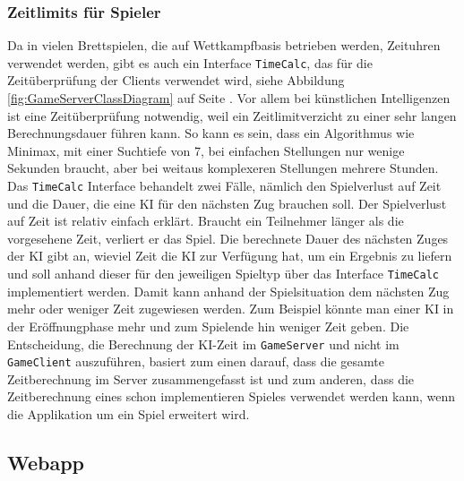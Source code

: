 \documentclass[12pt,a4paper,bibliography=totocnumbered,listof=totocnumbered]{article}
\begin{document}
\subsubsection{Zeitlimits für Spieler}
\label{chap:timelimit}
Da in vielen Brettspielen, die auf Wettkampfbasis betrieben werden, Zeituhren verwendet werden, gibt es auch ein Interface \texttt{TimeCalc}, das
für die Zeitüberprüfung der Clients verwendet wird, siehe Abbildung \ref{fig:GameServerClassDiagram} auf Seite \pageref{fig:GameServerClassDiagram}. 
Vor allem bei künstlichen Intelligenzen ist eine Zeitüberprüfung notwendig, weil ein 
Zeitlimitverzicht zu einer sehr langen Berechnungsdauer führen kann. So kann es sein, dass ein Algorithmus wie Minimax, mit einer Suchtiefe von 7, bei einfachen
Stellungen nur wenige Sekunden braucht, aber bei weitaus komplexeren Stellungen mehrere Stunden. 
Das \texttt{TimeCalc} Interface behandelt zwei Fälle, nämlich den Spielverlust auf Zeit und die 
Dauer, die eine \ac{KI} für den nächsten Zug brauchen soll. Der Spielverlust auf Zeit ist relativ einfach erklärt. Braucht ein Teilnehmer länger als 
die vorgesehene Zeit, verliert er das Spiel. Die berechnete Dauer des nächsten Zuges der \ac{KI} gibt an, wieviel Zeit die \ac{KI} zur Verfügung hat, um ein
Ergebnis zu liefern und soll anhand dieser für den jeweiligen Spieltyp über das 
Interface \texttt{TimeCalc} implementiert werden. Damit kann anhand der Spielsituation dem nächsten Zug mehr oder weniger Zeit zugewiesen werden. 
Zum Beispiel könnte man einer \ac{KI} in der Eröffnungphase mehr und zum Spielende hin weniger Zeit geben. 
Die Entscheidung, die Berechnung der \ac{KI}-Zeit im \texttt{GameServer} und nicht im \texttt{GameClient} auszuführen, basiert zum einen darauf, 
dass die gesamte Zeitberechnung im Server zusammengefasst ist und zum anderen, dass
die Zeitberechnung eines schon implementieren Spieles verwendet werden kann, wenn die Applikation um ein Spiel erweitert wird.

\subsection{Webapp}
\end{document}
